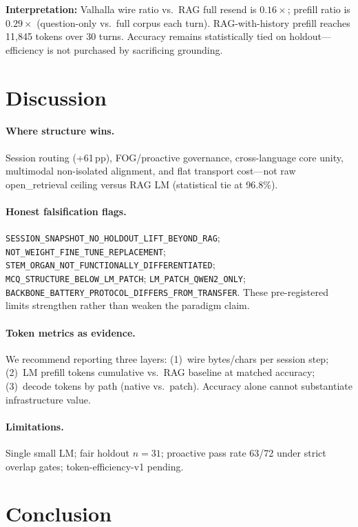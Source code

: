 \documentclass[11pt,a4paper]{article}
\begin{document}
\textbf{Interpretation:} Valhalla wire ratio vs.\ RAG full resend is $0.16\times$; prefill ratio is $0.29\times$ (question-only vs.\ full corpus each turn). RAG-with-history prefill reaches 11{,}845 tokens over 30 turns. Accuracy remains statistically tied on holdout---efficiency is not purchased by sacrificing grounding.

\section{Discussion}

\paragraph{Where structure wins.}
Session routing (+61\,pp), FOG/proactive governance, cross-language core unity, multimodal non-isolated alignment, and flat transport cost---not raw open\_retrieval ceiling versus RAG LM (statistical tie at 96.8\%).

\paragraph{Honest falsification flags.}
\texttt{SESSION\_SNAPSHOT\_NO\_HOLDOUT\_LIFT\_BEYOND\_RAG}; \texttt{NOT\_WEIGHT\_FINE\_TUNE\_REPLACEMENT}; \texttt{STEM\_ORGAN\_NOT\_FUNCTIONALLY\_DIFFERENTIATED}; \texttt{MCQ\_STRUCTURE\_BELOW\_LM\_PATCH}; \texttt{LM\_PATCH\_QWEN2\_ONLY}; \texttt{BACKBONE\_BATTERY\_PROTOCOL\_DIFFERS\_FROM\_TRANSFER}. These pre-registered limits strengthen rather than weaken the paradigm claim.

\paragraph{Token metrics as evidence.}
We recommend reporting three layers: (1)~wire bytes/chars per session step; (2)~LM prefill tokens cumulative vs.\ RAG baseline at matched accuracy; (3)~decode tokens by path (native vs.\ patch). Accuracy alone cannot substantiate infrastructure value.

\paragraph{Limitations.}
Single small LM; fair holdout $n=31$; proactive pass rate 63/72 under strict overlap gates; token-efficiency-v1 pending.

\section{Conclusion}
\end{document}
